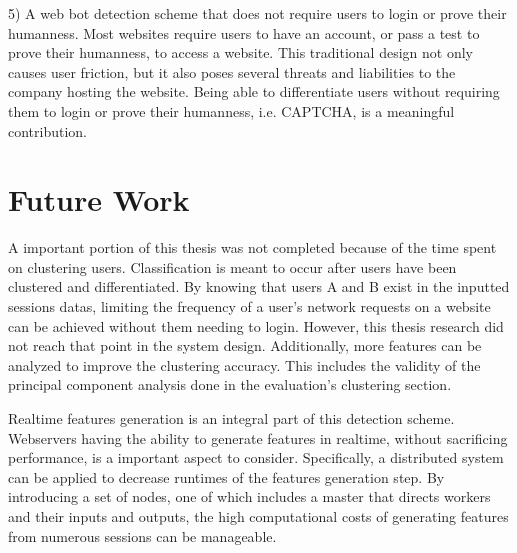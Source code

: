 5) A web bot detection scheme that does not require users to login or prove their humanness.
Most websites require users to have an account, or pass a test to prove their humanness, to access a website.
This traditional design not only causes user friction, but it also poses several threats and liabilities to the company hosting the website.
Being able to differentiate users without requiring them to login or prove their humanness, i.e. CAPTCHA, is a meaningful contribution.

\section{Future Work}\label{sec:future-work}
A important portion of this thesis was not completed because of the time spent on clustering users.
Classification is meant to occur after users have been clustered and differentiated.
By knowing that users A and B exist in the inputted sessions datas, limiting the frequency of a user's network requests on a website can be achieved without them needing to login.
However, this thesis research did not reach that point in the system design.
Additionally, more features can be analyzed to improve the clustering accuracy.
This includes the validity of the principal component analysis done in the evaluation's clustering section.

Realtime features generation is an integral part of this detection scheme.
Webservers having the ability to generate features in realtime, without sacrificing performance, is a important aspect to consider.
Specifically, a distributed system can be applied to decrease runtimes of the features generation step.
By introducing a set of nodes, one of which includes a master that directs workers and their inputs and outputs, the high computational costs of generating features from numerous sessions can be manageable.
